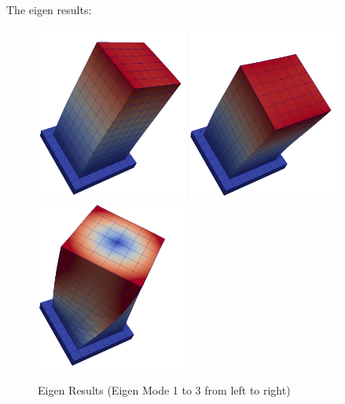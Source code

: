 The eigen results:

\begin{figure}[H]
  \centering
  \includegraphics[width = 5cm]{./Figure-files/nonlinear_analysis_steps/structure/eigen/eigen1.png}
  \includegraphics[width = 5cm]{./Figure-files/nonlinear_analysis_steps/structure/eigen/eigen2.png}
  \includegraphics[width = 5cm]{./Figure-files/nonlinear_analysis_steps/structure/eigen/eigen3.png}
  \caption{Eigen Results (Eigen Mode 1 to 3 from left to right)}
  \label{fig_eigen_results_1}
\end{figure}


